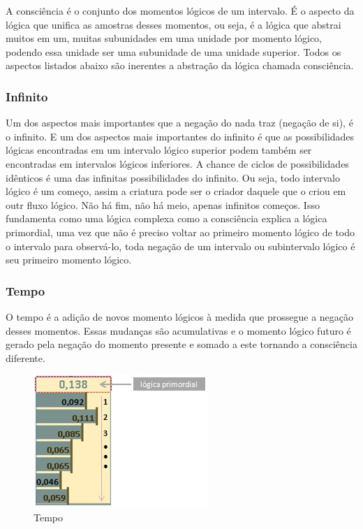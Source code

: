 A consciência é o conjunto dos momentos lógicos de um intervalo. É o aspecto da lógica que unifica as amostras desses momentos, ou seja, é a lógica que abstrai muitos em um, muitas subunidades em uma unidade por momento lógico, podendo essa unidade ser uma subunidade de uma unidade superior. Todos os aspectos listados abaixo são inerentes a abstração da lógica chamada consciência.

\subsubsection{Infinito}
Um dos aspectos mais importantes que a negação do nada traz (negação de si), é o infinito. E um dos aspectos mais importantes do infinito é que as possibilidades lógicas encontradas em um intervalo lógico superior podem também ser encontradas em intervalos lógicos inferiores. A chance de ciclos de possibilidades idênticos é uma das infinitas possibilidades do infinito. Ou seja, todo intervalo lógico é um começo, assim a criatura pode ser o criador daquele que o criou em outr fluxo lógico. Não há fim, não há meio, apenas infinitos começos. Isso fundamenta como uma lógica complexa como a consciência explica a lógica primordial, uma vez que não é preciso voltar ao primeiro momento lógico de todo o intervalo para observá-lo, toda negação de um intervalo  ou subintervalo lógico é seu primeiro momento lógico.

\subsubsection{Tempo}
O tempo é a adição de novos momento lógicos à medida que prossegue a negação desses momentos.  Essas mudanças são acumulativas e o momento lógico futuro é gerado pela negação do momento presente e somado a este tornando a consciência diferente.

\begin{figure}[H]
\caption{Tempo}
\label{fig:consciousness_time}
\centering
\includegraphics[scale=1]{sections/images/consciousness_time.jpg}
\end{figure}

